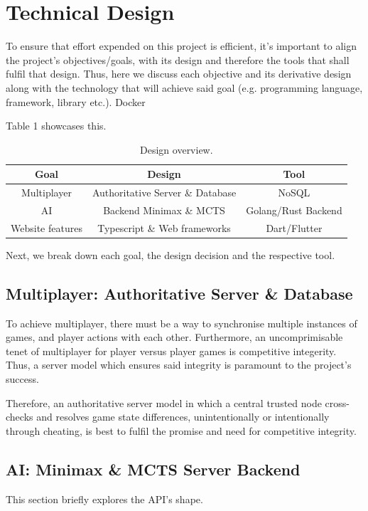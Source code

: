 \section{Technical Design}
To ensure that effort expended on this project is efficient,  it's important
to align the project's objectives/goals, with its design and therefore the tools that shall fulfil that design.
Thus, here we discuss each objective and its derivative design along with the technology that will
achieve said goal (e.g. programming language, framework, library etc.). 
Docker

Table 1 showcases this.

\begin{table}[h!]
\begin{center}
\begin{tabular}{||c | c | c||}
    \hline
    Goal & Design & Tool \\

    \hline
    Multiplayer & Authoritative Server \& Database & NoSQL \\
    \hline
    AI          & Backend Minimax \& MCTS & Golang/Rust Backend \\
    \hline
    Website features & Typescript \& Web frameworks & Dart/Flutter \\ 
    \hline 
\end{tabular}
\end{center}
\caption{Design overview.}
\label{table:1}
\end{table}

Next, we break down each goal, the design decision and the respective tool. 

\subsection {Multiplayer: Authoritative Server \& Database}
To achieve multiplayer, there must be a way to synchronise multiple instances of games, and player actions with each other.
Furthermore, an uncomprimisable tenet of multiplayer for player versus player games is competitive integerity. Thus,
a server model which ensures said integrity is paramount to the project's success.

Therefore, an authoritative server model in which a central trusted node cross-checks and resolves game state differences, unintentionally or intentionally through cheating,
is best to fulfil the promise and need for competitive integrity. 

\subsection {AI: Minimax \& MCTS Server Backend}
This section briefly explores the API's shape. 


